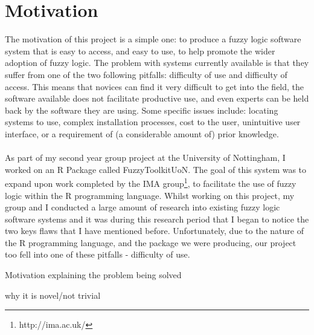 \section{Motivation}
The motivation of this project is a simple one: to produce a fuzzy logic software system that is easy to access, and easy to use, to help promote the wider adoption of fuzzy logic. The problem with systems currently available is that they suffer from one of the two following pitfalls: difficulty of use and difficulty of access. This means that novices can find it very difficult to get into the field, the software available does not facilitate productive use, and even experts can be held back by the software they are using. Some specific issues include: locating systems to use, complex installation processes, cost to the user, unintuitive user interface, or a requirement of (a considerable amount of) prior knowledge. 
\ \\
\ \\
As part of my second year group project at the University of Nottingham, I worked on an R Package called FuzzyToolkitUoN. The goal of this system was to expand upon work completed by the IMA group\footnote{http://ima.ac.uk/}, to facilitate the use of fuzzy logic within the R programming language. Whilst working on this project, my group and I conducted a large amount of research into existing fuzzy logic software systems and it was during this research period that I began to notice the two keys flaws that I have mentioned before. Unfortunately, due to the nature of the R programming language, and the package we were producing, our project too fell into one of these pitfalls - difficulty of use. 


{\color{red} Motivation explaining the problem being solved}

{\color{red} why it is novel/not trivial }